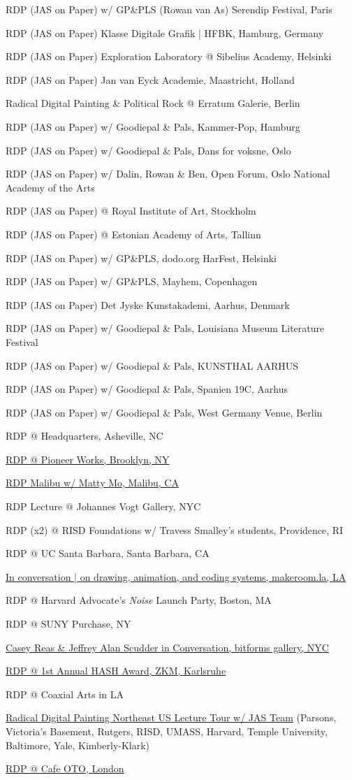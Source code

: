 \documentclass[10pt,letterpaper]{article}
\newlength{\cvyearwidth}
\newenvironment{cvlist}{%
  \begin{list}{}{%
    \setlength{\leftmargin}{\cvyearwidth}%
    \setlength{\labelwidth}{\cvyearwidth}%
    \setlength{\labelsep}{0.4em}%
    \setlength{\itemsep}{0.15em}%
    \setlength{\parsep}{0pt}%
    \setlength{\topsep}{0.2em}%
    \renewcommand{\makelabel}[1]{\color{acgray}\small ##1\hfill}%
  }%
}{\end{list}}
\newcommand{\cv}[2]{\item[#1] #2}
\begin{document}
\begin{cvlist}
  \cv{2018}{RDP (JAS on Paper) w/ GP\&PLS (Rowan van As) Serendip Festival, Paris}
  \cv{2018}{RDP (JAS on Paper) Klasse Digitale Grafik | HFBK, Hamburg, Germany}
  \cv{2018}{RDP (JAS on Paper) Exploration Laboratory @ Sibelius Academy, Helsinki}
  \cv{2018}{RDP (JAS on Paper) Jan van Eyck Academie, Maastricht, Holland}
  \cv{2018}{Radical Digital Painting \& Political Rock @ Erratum Galerie, Berlin}
  \cv{2018}{RDP (JAS on Paper) w/ Goodiepal \& Pals, Kammer-Pop, Hamburg}
  \cv{2018}{RDP (JAS on Paper) w/ Goodiepal \& Pals, Dans for voksne, Oslo}
  \cv{2018}{RDP (JAS on Paper) w/ Dalin, Rowan \& Ben, Open Forum, Oslo National Academy of the Arts}
  \cv{2018}{RDP (JAS on Paper) @ Royal Institute of Art, Stockholm}
  \cv{2018}{RDP (JAS on Paper) @ Estonian Academy of Arts, Tallinn}
  \cv{2018}{RDP (JAS on Paper) w/ GP\&PLS, dodo.org HarFest, Helsinki}
  \cv{2018}{RDP (JAS on Paper) w/ GP\&PLS, Mayhem, Copenhagen}
  \cv{2018}{RDP (JAS on Paper) Det Jyske Kunstakademi, Aarhus, Denmark}
  \cv{2018}{RDP (JAS on Paper) w/ Goodiepal \& Pals, Louisiana Museum Literature Festival}
  \cv{2018}{RDP (JAS on Paper) w/ Goodiepal \& Pals, KUNSTHAL AARHUS}
  \cv{2018}{RDP (JAS on Paper) w/ Goodiepal \& Pals, Spanien 19C, Aarhus}
  \cv{2018}{RDP (JAS on Paper) w/ Goodiepal \& Pals, West Germany Venue, Berlin}
  \cv{2018}{RDP @ Headquarters, Asheville, NC}
  \cv{2018}{\href{https://www.instagram.com/p/BlTvNt-BJQ5DbNzzsEGyegK0-f4Uz7O1MwEAB80/?taken-by=justanothersystem}{RDP @ Pioneer Works, Brooklyn, NY}}
  \cv{2018}{\href{https://www.youtube.com/watch?v=Up2-myTEviE}{RDP Malibu w/ Matty Mo, Malibu, CA}}
  \cv{2018}{RDP Lecture @ Johannes Vogt Gallery, NYC}
  \cv{2018}{RDP (x2) @ RISD Foundations w/ Travess Smalley's students, Providence, RI}
  \cv{2018}{RDP @ UC Santa Barbara, Santa Barbara, CA}
  \cv{2018}{\href{https://www.facebook.com/events/2058744684449454}{In conversation | on drawing, animation, and coding systems, makeroom.la, LA}}
  \cv{2018}{RDP @ Harvard Advocate's \emph{Noise} Launch Party, Boston, MA}
  \cv{2018}{RDP @ SUNY Purchase, NY}
  \cv{2018}{\href{https://www.facebook.com/events/1901578033465958}{Casey Reas \& Jeffrey Alan Scudder in Conversation, bitforms gallery, NYC}}
  \cv{2018}{\href{https://www.youtube.com/watch?v=533s7uZ35rQ}{RDP @ 1st Annual HASH Award, ZKM, Karlsruhe}}
  \cv{2018}{RDP @ Coaxial Arts in LA}
  \cv{2017}{\href{https://justanothersystem.org}{Radical Digital Painting Northeast US Lecture Tour w/ JAS Team} (Parsons, Victoria's Basement, Rutgers, RISD, UMASS, Harvard, Temple University, Baltimore, Yale, Kimberly-Klark)}
  \cv{2017}{\href{https://vimeo.com/230450728}{RDP @ Cafe OTO, London}}

\end{cvlist}
\end{document}
